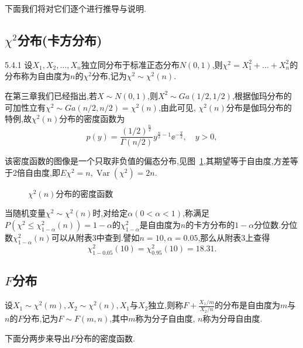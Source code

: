 下面我们将对它们逐个进行推导与说明.
\subsection{$\chi^2$分布(卡方分布)\label{ssec:5.4.1}}
\begin{definition}{}{5.4.1}
设$X_1,X_2,\dotsc,X_n$独立同分布于标准正态分布$N(0,1)$,则$\chi^2=X_1^2+\dotsc+X_n^2$的分布称为自由度为$n$的$\chi^2$分布,记为$\chi^2\sim\chi^2(n)$.
\end{definition}

在第三章我们已经指出,若$X\sim N(0,1)$,则$X^2\sim Ga(1/2,1/2)$,根据伽玛分布的可加性立有$\chi^2\sim Ga(n/2,n/2)=\chi^2(n)$,由此可见, $\chi^2(n)$分布是伽玛分布的特例,故$\chi^2(n)$分布的密度函数为
\[p(y)=\frac{(1/2)^{\frac n2}}{\Gamma(n/2)}y^{\frac n2-1}\ee^{-\frac y2},\quad y>0,\]

该密度函数的图像是一个只取非负值的偏态分布,见图~\ref{fig:5.4.1},其期望等于自由度,方差等于2倍自由度,即$E\chi^2=n,\operatorname{Var}(\chi^2)=2n$.
\begin{figure}[!ht]
  \centering
{}
  \caption{$\chi^2(n)$分布的密度函数}\label{fig:5.4.1}
\end{figure}


当随机变量$\chi^2\sim\chi^2(n)$时,对给定$\alpha(0<\alpha<1)$,称满足$P(\chi^2\leq\chi_{1-\alpha}^2(n))=1-\alpha$的$\chi_{1-\alpha}^2$是自由度为$n$的卡方分布的$1-\alpha$分位数.分位数$\chi_{1-\alpha}^2(n)$可以从附表3中查到.譬如$n=10,\alpha=0.05$,那么从附表3上查得
\[\chi_{1-0.05}^2(10)=\chi_{0.95}^2(10)=18.31.\]
\subsection{$F$分布\label{ssec:5.4.2}}
\begin{definition}{}{}
设$X_1\sim\chi^2(m),X_2\sim\chi^2(n),X_1$与$X_2$独立,则称$F+\frac{X_1/m}{X_2/n}$的分布是自由度为$m$与$n$的$F$分布,记为$F\sim F(m,n)$,其中$m$称为分子自由度, $n$称为分母自由度.
\end{definition}
下面分两步来导出$F$分布的密度函数.

